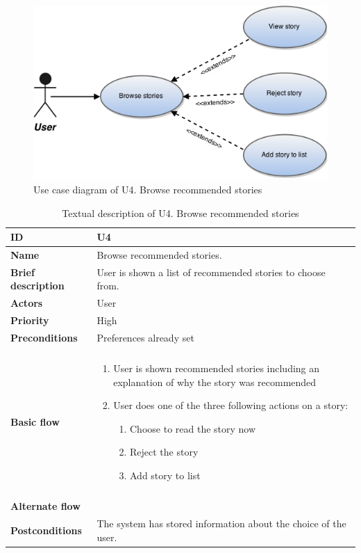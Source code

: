 \begin{figure}[htp]
	\includegraphics[width=\textwidth]{fig/U4}
	\centering
	\caption{Use case diagram of U4. Browse recommended stories}
	\label{Fig:U4}
\end{figure}

\begin{table}[htp]
	\centering
	\caption{Textual description of U4. Browse recommended stories}
	\begin{tabular}[b]{|l | l|}\hline
		\textbf{ID} 				& U4									\\\hline
		\textbf{Name} 				& Browse recommended stories.			\\\hline
		\textbf{Brief description}	& User is shown a list of recommended stories to choose from. 		\\\hline
		\textbf{Actors} 			& User									\\\hline
		\textbf{Priority}			& High									\\\hline
		\textbf{Preconditions}		& Preferences already set				\\\hline&\\[-2ex]
		\textbf{Basic flow}			& \begin{minipage}{5in}
			\begin{enumerate}[noitemsep]
				\item User is shown recommended stories including an explanation of why the story was recommended
				\item User does one of the three following actions on a story:
					\begin{enumerate}
						\item Choose to read the story now
						\item Reject the story
						\item Add story to list  
					\end{enumerate}
			\end{enumerate}						
		\end{minipage}						\\\hline&\\[-2ex]
		\textbf{Alternate flow}		& \begin{minipage}{5in}
		\end{minipage}							\\\hline
		\textbf{Postconditions}		& The system has stored information about the choice of the user.\\\hline
	\end{tabular}
	\label{Tab:U4}
\end{table}

